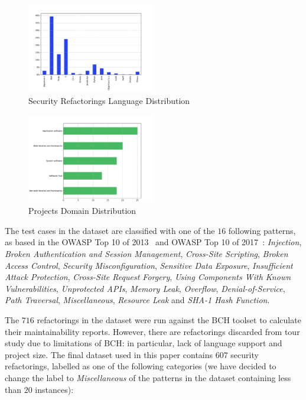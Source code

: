 \documentclass[10pt,conference]{IEEEtran}
\begin{document}
\begin{figure}[h]
 	\centering 	\includegraphics[width=0.5\textwidth]{figures/language_dist.pdf}
 	\caption{Security Refactorings Language Distribution}
	\label{fig:lang}
\end{figure}

\begin{figure}[h]
 	\centering 	\includegraphics[width=0.5\textwidth]{figures/type_dist.pdf}
 	\caption{Projects Domain Distribution}
	\label{fig:domain}
\end{figure}

The test cases in the dataset are classified with one of the $16$ following
patterns, as based in the OWASP Top 10 of 2013~\cite{oswap:2013} and OWASP Top
10 of 2017~\cite{oswap:2017}: \textit{Injection}, \textit{Broken Authentication
and Session Management}, \textit{Cross-Site Scripting}, \textit{Broken Access
Control}, \textit{Security Misconfiguration}, \textit{Sensitive Data Exposure},
\textit{Insufficient Attack Protection}, \textit{Cross-Site Request Forgery},
\textit{Using Components With Known Vulnerabilities}, \textit{Unprotected APIs},
\textit{Memory Leak}, \textit{Overflow}, \textit{Denial-of-Service},
\textit{Path Traversal}, \textit{Miscellaneous}, \textit{Resource Leak} and
\textit{SHA-1 Hash Function}.

The $716$ refactorings in the dataset were run against the BCH toolset to
calculate their maintainability reports. However, there are refactorings
discarded from tour study due to limitations of BCH: in particular, lack of
language support and project size. The final dataset used in this paper contains
$607$ security refactorings, labelled as one of the following categories (we
have decided to change the label to \textit{Miscellaneous} of the patterns in
the dataset containing less than $20$ instances):
\end{document}
